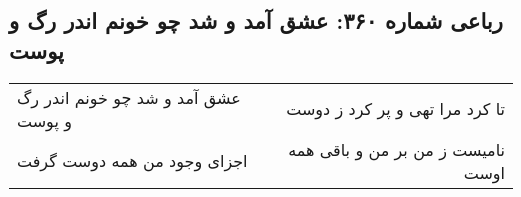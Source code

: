 \begin{center}
\section*{رباعی شماره ۳۶۰: عشق آمد و شد چو خونم اندر رگ و پوست}
\label{sec:0360}
\begin{longtable}{l p{0.5cm} r}
عشق آمد و شد چو خونم اندر رگ و پوست
&&
تا کرد مرا تهی و پر کرد ز دوست
\\
اجزای وجود من همه دوست گرفت
&&
نامیست ز من بر من و باقی همه اوست
\\
\end{longtable}
\end{center}
